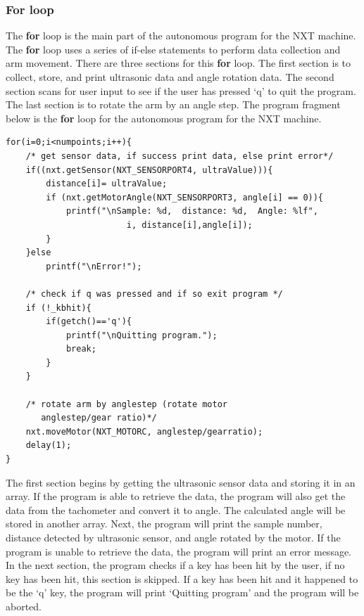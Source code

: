 \documentclass[11pt]{article}
\begin{document}
\subsubsection*{For loop}
The {\bf for} loop is the main part of the autonomous program for the NXT machine.
The {\bf for} loop uses a series of if-else statements to perform data collection 
and arm movement. There are three sections for this {\bf for} loop. The first 
section is to collect, store, and print ultrasonic data and angle rotation data. 
The second section scans for user input to see if the user has pressed `q' to quit 
the program. The last section is to rotate the arm by an angle step. The program 
fragment below is the {\bf for} loop for the autonomous program for the NXT machine.
\begin{lstlisting}
for(i=0;i<numpoints;i++){
    /* get sensor data, if success print data, else print error*/
    if((nxt.getSensor(NXT_SENSORPORT4, ultraValue))){
        distance[i]= ultraValue;
        if (nxt.getMotorAngle(NXT_SENSORPORT3, angle[i] == 0)){
            printf("\nSample: %d,  distance: %d,  Angle: %lf",
                        i, distance[i],angle[i]);
        }
    }else	
        printf("\nError!");

    /* check if q was pressed and if so exit program */
    if (!_kbhit){
        if(getch()=='q'){
            printf("\nQuitting program.");
            break;
        }
    }		

    /* rotate arm by anglestep (rotate motor 
       anglestep/gear ratio)*/
    nxt.moveMotor(NXT_MOTORC, anglestep/gearratio);
    delay(1);
}
\end{lstlisting}
The first section begins by getting the ultrasonic sensor data and storing it in 
an array. If the program is able to retrieve the data, the program will also 
get the data from the tachometer and convert it to angle. The calculated angle 
will be stored in another array. Next, the program will print the sample number, 
distance detected by ultrasonic sensor, and angle rotated by the motor. If the 
program is unable to retrieve the data, the program will print an error message.\\ 

In the next section, the program checks if a key has been hit by the user, if 
no key has been hit, this section is skipped. If a key has been hit and it 
happened to be the `q' key, the program will print `Quitting program' and the 
program will be aborted.\\
\end{document}
